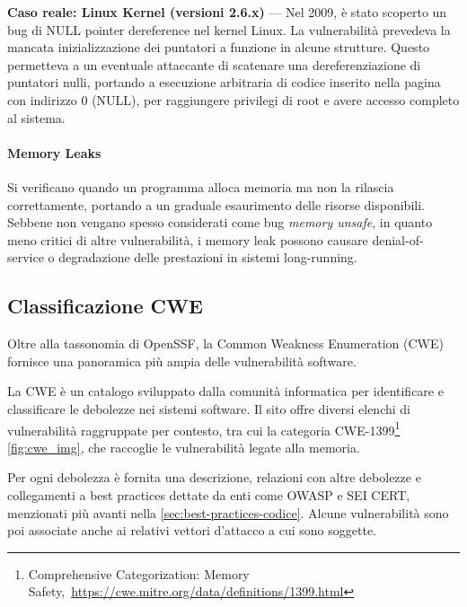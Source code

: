 \textbf{Caso reale: Linux Kernel (versioni 2.6.x)} — Nel 2009, è stato scoperto un
bug di NULL pointer dereference nel kernel Linux. La vulnerabilità prevedeva la
mancata inizializzazione dei puntatori a funzione in alcune strutture. Questo permetteva
a un eventuale attaccante di scatenare una dereferenziazione di puntatori nulli,
portando a esecuzione arbitraria di codice inserito nella pagina con indirizzo 0
(NULL), per raggiungere privilegi di root e avere accesso completo al sistema.\cite{null_pointer_dereference_linux}

\paragraph{Memory Leaks}
\label{sec:memory_leaks} Si verificano quando un programma alloca memoria ma non
la rilascia correttamente, portando a un graduale esaurimento delle risorse
disponibili. Sebbene non vengano spesso considerati come bug \textit{memory
unsafe}, in quanto meno critici di altre vulnerabilità, i memory leak possono
causare denial-of-service o degradazione delle prestazioni in sistemi long-running.


\subsection{Classificazione CWE}
Oltre alla tassonomia di OpenSSF, la Common Weakness Enumeration (CWE) fornisce
una panoramica più ampia delle vulnerabilità software.

La CWE è un catalogo sviluppato dalla comunità informatica per identificare e
classificare le debolezze nei sistemi software. Il sito offre diversi elenchi di
vulnerabilità raggruppate per contesto, tra cui la categoria CWE-1399\footnote{Comprehensive
Categorization: Memory Safety,~\url{https://cwe.mitre.org/data/definitions/1399.html}}
\autoref{fig:cwe_img}, che raccoglie le vulnerabilità legate alla memoria.

Per ogni debolezza è fornita una descrizione, relazioni con altre debolezze e collegamenti
a best practices dettate da enti come OWASP e SEI CERT, menzionati più avanti
nella \autoref{sec:best-practices-codice}. Alcune vulnerabilità sono poi associate
anche ai relativi vettori d'attacco a cui sono soggette.

